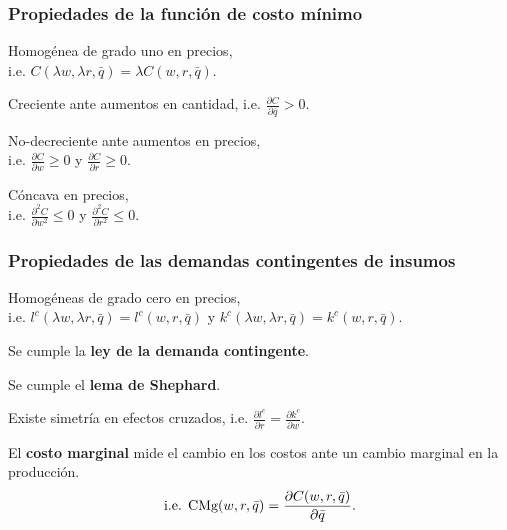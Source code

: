 \documentclass[8pt,a4paper]{extarticle}
\begin{document}
\begin{multicols}{3}
	\subsubsection{Propiedades de la función de costo mínimo}

	\begin{eqlist}
		\item Homogénea de grado uno en precios, \\ i.e. $C(\lambda w, \lambda r, \bar{q}) = \lambda C(w, r, \bar{q}) $.
		\item Creciente ante aumentos en cantidad, i.e. $\displaystyle \frac{\partial C}{\partial \bar{q}} > 0 $.
		\item No-decreciente ante aumentos en precios, \\ i.e. $\displaystyle \frac{\partial C}{\partial w} \ge 0$ y $\displaystyle \frac{\partial C}{\partial r} \ge 0$.
		\item Cóncava en precios, \\ i.e. $\displaystyle \frac{\partial^2 C}{\partial w^2} \le 0$ y $\displaystyle \frac{\partial^2 C}{\partial r^2} \le 0$.
	\end{eqlist}

	\subsubsection{Propiedades de las demandas contingentes de insumos}

	\begin{eqlist}
		\item Homogéneas de grado cero en precios, \\ i.e. $l^c (\lambda w, \lambda r, \bar{q}) = l^c (w, r, \bar{q})$ y $k^c (\lambda w, \lambda r, \bar{q}) = k^c (w, r, \bar{q})$.
		\item Se cumple la \textbf{ley de la demanda contingente}.
		\item Se cumple el \textbf{lema de Shephard}.
		\item Existe simetría en efectos cruzados, i.e. $\displaystyle \frac{\partial l^c}{\partial r} = \frac{\partial k^c}{\partial w}$.
	\end{eqlist}

	\begin{boxdef}
		El \textbf{costo marginal} mide el cambio en los costos ante un cambio marginal en la producción.
		\[
			\text{\normalfont i.e. CMg} (w, r, \bar{q}) = \frac{\partial C (w, r, \bar{q})}{\partial \bar{q}}
			.\]
	\end{boxdef}


\end{multicols}
\end{document}
